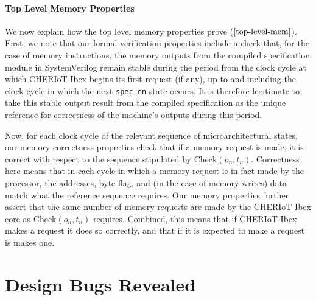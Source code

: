 \documentclass[10pt,conference]{IEEEtran}
\begin{document}
\paragraph{Top Level Memory Properties}

We now explain how the top level memory properties prove ($\ref{top-level-mem}$).
First, we note that our formal verification properties include a check
that, for the case of memory instructions, the memory outputs from the compiled
specification module in SystemVerilog remain stable during the period from
the clock cycle at which CHERIoT-Ibex begins its first request (if any),
up to and including the clock cycle in which the next \verb|spec_en| state occurs. It
is therefore legitimate to take this stable output result from the compiled
specification as the unique reference for correctness of the machine's
outputs during this period.

Now, for each clock cycle of the relevant sequence of
microarchitectural states, our memory correctness properties check that if
a memory request is made, it is correct with respect to the sequence
stipulated by $\mathrm{Check}(o_n, t_n)$. Correctness here means that in each cycle
in which a memory request is in fact made by the processor, the addresses,
byte flag, and (in the case of memory writes) data match what the reference
sequence requires. Our memory properties further assert that the same
number of memory requests are made by the CHERIoT-Ibex core as $\mathrm{Check}(o_n, t_n)$
requires. Combined, this means that if CHERIoT-Ibex makes a request it does so correctly,
and that if it is expected to make a request is makes one.

\section{Design Bugs Revealed}
\end{document}
